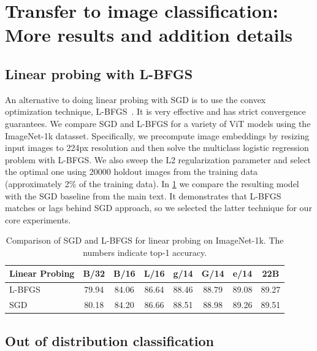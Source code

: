 \documentclass{article}
\begin{document}
\section{Transfer to image classification: More results and addition details}

\subsection{Linear probing with L-BFGS}\label{app:linear}
An alternative to doing linear probing with SGD is to use the convex optimization technique, L-BFGS~\citep{byrd1995limited}. It is very effective and has strict convergence guarantees. We compare SGD and L-BFGS for a variety of ViT models using the ImageNet-1k datasset. Specifically, we precompute image embeddings by resizing input images to 224px resolution and then solve the multiclass logistic regression problem with L-BFGS. We also sweep the L2 regularization parameter and select the optimal one using 20000 holdout images from the training data (approximately 2\% of the training data). In \cref{tab:app:bfgs} we compare the resulting model with the SGD baseline from the main text. It demonstrates that L-BFGS matches or lags behind SGD approach, so we selected the latter technique for our core experiments.

\begin{table}[h]
    \caption{Comparison of SGD and L-BFGS for linear probing on ImageNet-1k. The numbers indicate top-1 accuracy.}
\centering
\small
  \setlength{\tabcolsep}{4pt}
    \begin{tabular}{@{} l c c c c c c c @{}}
      \toprule
	    Linear Probing & B/32 & B/16 & L/16 & g/14 & G/14 & e/14 & 22B \\
      \midrule
      L-BFGS & 79.94 & 84.06 & 86.64 & 88.46 & 88.79 & 89.08 & 89.27 \\
      SGD & 80.18 & 84.20 & 86.66 & 88.51 & 88.98 & 89.26 & 89.51 \\
      \bottomrule
 \end{tabular}
    \label{tab:app:bfgs}
\end{table}

\label{app:image_classification}

\subsection{Out of distribution classification}
\label{app:ood}
\end{document}
